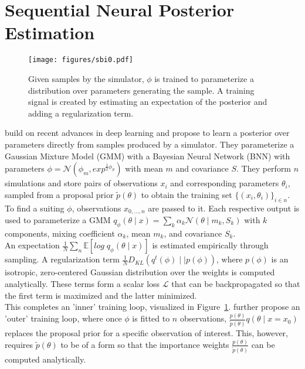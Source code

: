 \documentclass[12pt]{article}
\begin{document}
 



\section*{Sequential Neural Posterior Estimation}
\begin{figure}
	\centering
	\texttt{[image: figures/sbi0.pdf]}
	\caption{Given samples by the simulator, $\phi$ is trained to parameterize a distribution over parameters generating the sample. A training signal is created by estimating an expectation of the posterior and adding a regularization term.}
	\label{fig:sbiloop}
\end{figure} 
\citet{papamakarios2016fast} build on recent advances in deep learning and propose to learn a posterior over parameters directly from samples produced by a simulator. They parameterize a Gaussian Mixture Model (GMM) with a Bayesian Neural Network (BNN) with parameters $\phi = \mathcal{N}(\phi_m, exp^{\frac{1}{2}\phi_S})$ with mean $m$ and covariance $S$. They perform $n$ simulations and store pairs of observations $x_i$ and corresponding parameters $\theta_i$, sampled from a proposal prior $\tilde{p}(\theta)$ to obtain the  training set $\lbrace(x_i,\theta_i)\rbrace_{i \in n}$. 
To find a suiting $\phi$, observations $x_{0,...,n}$ are passed to it. Each respective output is used to parameterize a GMM $q_{\phi}(\theta\mid x) = \sum_k \alpha_k \mathcal{N}(\theta\mid m_k, S_k)$ with $k$ components, mixing coefficient $\alpha_k$, mean $m_k$, and covariance $S_k$.\\
An expectation $\frac{1}{N} \sum_n\mathbb{E} \left[ log\;q_{\phi}(\theta \mid x)\right]$ is estimated empirically through sampling. A regularization term $\frac{1}{N}\mathit{D}_{KL}(q^t(\phi) \mid\mid p(\phi))$, where $p(\phi)$ is an isotropic, zero-centered Gaussian distribution over the weights is computed analytically. These terms form a scalar loss $\mathcal{L}$ that can be backpropagated so that the first term is maximized and the latter minimized.\\
This completes an 'inner' training loop, visualized in Figure~\ref{fig:sbiloop}. \citet{papamakarios2016fast} further propose an 'outer' training loop, where once $\phi$ is fitted to $n$ observations, $\frac{p(\theta)}{\tilde{p}(\theta)}q(\theta \mid  x=x_0)$ replaces the proposal prior for a specific observation of interest. This, however, requires $\tilde{p}(\theta)$ to be of a form so that the importance weights $\frac{p(\theta)}{\tilde{p}(\theta)}$ can be computed analytically.
\end{document}
